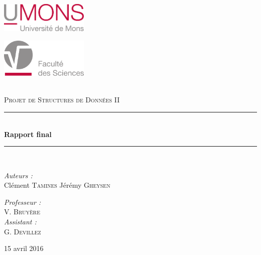 \documentclass[11pt,a4paper]{article}
\newcommand{\reporttitle}{Rapport final}
\newcommand{\reportauthor}{Clément \textsc{Tamines} Jérémy \textsc{Gheysen}}
\newcommand{\reportsubject}{Projet de Structures de Données II}
\newcommand{\HRule}{\rule{\linewidth}{0.5mm}}
\begin{document}

\begin{titlepage}
\begin{center}
\begin{minipage}[t]{0.48\textwidth}
  \begin{flushleft}
     \includegraphics[width=42mm]{UMONS+txt.pdf} \\[0.5cm]
  \end{flushleft}
\end{minipage}
\begin{minipage}[t]{0.48\textwidth}
  \begin{flushright}
    \includegraphics [width=42mm]{UMONS_FS.pdf} \\[0.5cm]
  \end{flushright}
\end{minipage} \\[1.5cm]

\vspace{1.5cm}
\textsc{\Large \reportsubject}\\[0.5cm]
\HRule \\[0.4cm]
{\huge \bfseries \reporttitle}\\[0.4cm]
\HRule \\[1.5cm]

\begin{minipage}[t]{0.3\textwidth}
  \begin{flushleft} \large
    \emph{Auteurs :}\\
    \reportauthor
  \end{flushleft}
\end{minipage}
\begin{minipage}[t]{0.6\textwidth}
  \begin{flushright} \large
    \emph{Professeur :} \\
    V. \textsc{Bruyère} \\
     \emph{Assistant :} \\
    G. \textsc{Devillez}
  \end{flushright}
\end{minipage}
\vfill
{\large 15 avril 2016}

\end{center}
\end{titlepage}
\end{document}
